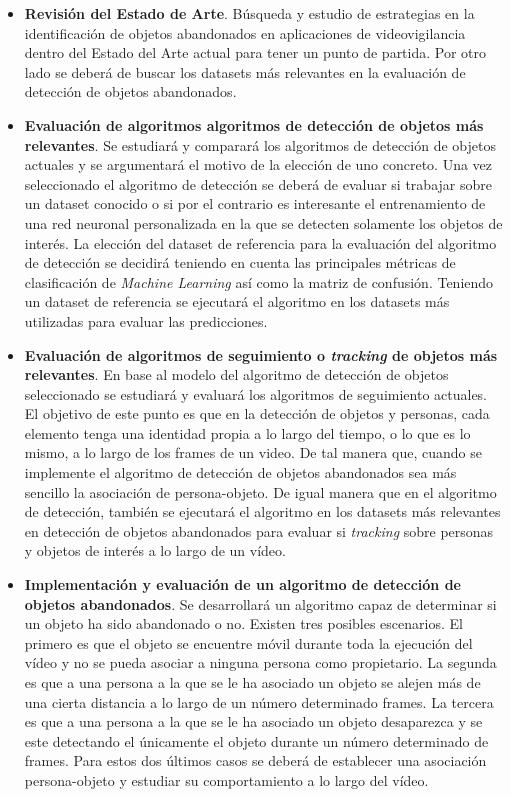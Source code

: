 \begin{itemize}
    \item \textbf{Revisión del Estado de Arte}. Búsqueda y estudio de estrategias en la identificación de objetos abandonados en aplicaciones de videovigilancia dentro del Estado del Arte actual para tener un punto de partida. Por otro lado se deberá de buscar los datasets más relevantes en la evaluación de detección de objetos abandonados.
    \item \textbf{Evaluación de algoritmos algoritmos de detección de objetos más relevantes}. Se estudiará y comparará los algoritmos de detección de objetos actuales y se argumentará el motivo de la elección de uno concreto. Una vez seleccionado el algoritmo de detección se deberá de evaluar si trabajar sobre un dataset conocido o si por el contrario es interesante el entrenamiento de una red neuronal personalizada en la que se detecten solamente los objetos de interés. La elección del dataset de referencia para la evaluación del algoritmo de detección se decidirá teniendo en cuenta las principales métricas de clasificación de \textit{Machine Learning} así como la matriz de confusión. Teniendo un dataset de referencia se ejecutará el algoritmo en los datasets más utilizadas para evaluar las predicciones.
    \item \textbf{Evaluación de algoritmos de seguimiento o \textit{tracking} de objetos más relevantes}. En base al modelo del algoritmo de detección de objetos seleccionado se estudiará y evaluará los algoritmos de seguimiento actuales. El objetivo de este punto es que en la detección de objetos y personas, cada elemento tenga una identidad propia a lo largo del tiempo, o lo que es lo mismo, a lo largo de los frames de un video. De tal manera que, cuando se implemente el algoritmo de detección de objetos abandonados sea más sencillo la asociación de persona-objeto. De igual manera que en el algoritmo de detección, también se ejecutará el algoritmo en los datasets más relevantes en detección de objetos abandonados para evaluar si \textit{tracking} sobre personas y objetos de interés a lo largo de un vídeo.
    \item \textbf{Implementación y evaluación de un algoritmo de detección de objetos abandonados}. Se desarrollará un algoritmo capaz de determinar si un objeto ha sido abandonado o no. Existen tres posibles escenarios. El primero es que el objeto se encuentre móvil durante toda la ejecución del vídeo y no se pueda asociar a ninguna persona como propietario. La segunda es que a una persona a la que se le ha asociado un objeto se alejen más de una cierta distancia a lo largo de un número determinado frames. La tercera es que a una persona a la que se le ha asociado un objeto desaparezca y se este detectando el únicamente el objeto durante un número determinado de frames. Para estos dos últimos casos se deberá de establecer una asociación persona-objeto y estudiar su comportamiento a lo largo del vídeo.
\end{itemize}

